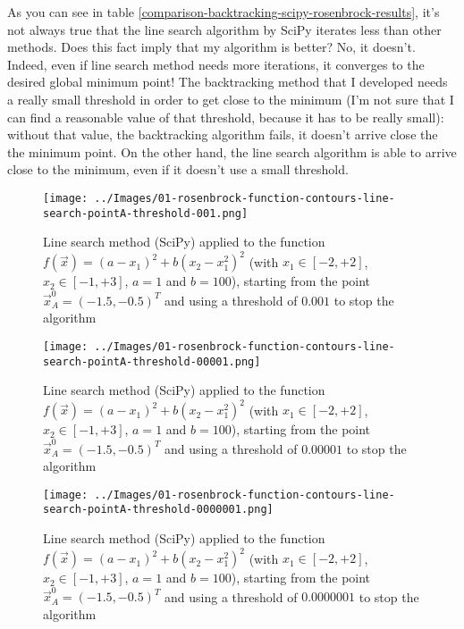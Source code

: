         As you can see in table \ref{comparison-backtracking-scipy-rosenbrock-results}, it's not always true that the line search algorithm by SciPy iterates less than other methods. Does this fact imply that my algorithm is better? No, it doesn't. Indeed, even if line search method needs more iterations, it converges to the desired global minimum point! The backtracking method that I developed needs a really small threshold in order to get close to the minimum (I'm not sure that I can find a reasonable value of that threshold, because it has to be really small): without that value, the backtracking algorithm fails, it doesn't arrive close the the minimum point. On the other hand, the line search algorithm is able to arrive close to the minimum, even if it doesn't use a small threshold.
        \begin{figure}
            \centering
            \texttt{[image: ../Images/01-rosenbrock-function-contours-line-search-pointA-threshold-001.png]}
            \caption{Line search method (SciPy) applied to the function \(f(\vec{x}) = (a - x_1)^2 + b(x_2 - x_1^2)^2\) (with \(x_1 \in [-2, +2]\), \(x_2 \in [-1, +3]\), \(a=1\) and \(b=100\)), starting from the point \(\vec{x}_A^0 = (-1.5,-0.5)^T\) and using a threshold of \(0.001\) to stop the algorithm}
            \label{rosenbrock-function-contours-line-search-pointA-threshold-001}
        \end{figure}
        \begin{figure}
            \centering
            \texttt{[image: ../Images/01-rosenbrock-function-contours-line-search-pointA-threshold-00001.png]}
            \caption{Line search method (SciPy) applied to the function \(f(\vec{x}) = (a - x_1)^2 + b(x_2 - x_1^2)^2\) (with \(x_1 \in [-2, +2]\), \(x_2 \in [-1, +3]\), \(a=1\) and \(b=100\)), starting from the point \(\vec{x}_A^0 = (-1.5,-0.5)^T\) and using a threshold of \(0.00001\) to stop the algorithm}
            \label{rosenbrock-function-contours-line-search-pointA-threshold-00001}
        \end{figure}
        \begin{figure}
            \centering
            \texttt{[image: ../Images/01-rosenbrock-function-contours-line-search-pointA-threshold-0000001.png]}
            \caption{Line search method (SciPy) applied to the function \(f(\vec{x}) = (a - x_1)^2 + b(x_2 - x_1^2)^2\) (with \(x_1 \in [-2, +2]\), \(x_2 \in [-1, +3]\), \(a=1\) and \(b=100\)), starting from the point \(\vec{x}_A^0 = (-1.5,-0.5)^T\) and using a threshold of \(0.0000001\) to stop the algorithm}
            \label{rosenbrock-function-contours-line-search-pointA-threshold-000001}
        \end{figure}
